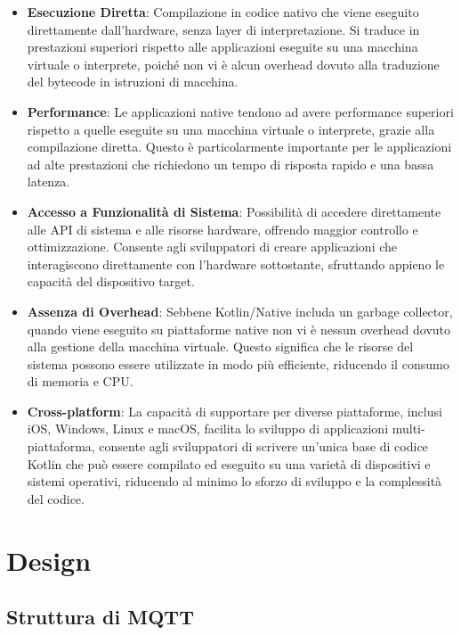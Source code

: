 \documentclass[12pt,a4paper,openright,twoside]{book}
\begin{document}
\begin{itemize}
\item \textbf{Esecuzione Diretta}: Compilazione in codice nativo che viene eseguito direttamente dall'hardware, senza layer di interpretazione. 
Si traduce in prestazioni superiori rispetto alle applicazioni eseguite su una macchina virtuale o interprete, poiché non vi è alcun overhead dovuto alla traduzione 
del bytecode in istruzioni di macchina.
\item \textbf{Performance}: Le applicazioni native tendono ad avere performance superiori rispetto a quelle eseguite su una macchina virtuale o interprete, 
grazie alla compilazione diretta. Questo è particolarmente importante per le applicazioni ad alte prestazioni che richiedono un tempo di risposta rapido e una bassa latenza.
\item \textbf{Accesso a Funzionalità di Sistema}: Possibilità di accedere direttamente alle API di sistema e alle risorse hardware, offrendo maggior controllo e ottimizzazione. 
Consente agli sviluppatori di creare applicazioni che interagiscono direttamente con l'hardware sottostante, sfruttando appieno le capacità del dispositivo target.
\item \textbf{Assenza di Overhead}: Sebbene Kotlin/Native includa un garbage collector, quando viene eseguito su piattaforme native non vi è nessun overhead dovuto alla 
gestione della macchina virtuale. Questo significa che le risorse del sistema possono essere utilizzate in modo più efficiente, riducendo il consumo di memoria e CPU.
\item \textbf{Cross-platform}: La capacità di supportare per diverse piattaforme, inclusi iOS, Windows, Linux e macOS, facilita lo sviluppo di applicazioni multi-piattaforma, 
consente agli sviluppatori di scrivere un'unica base di codice Kotlin che può essere compilato ed eseguito su una varietà di dispositivi e sistemi operativi, 
riducendo al minimo lo sforzo di sviluppo e la complessità del codice.
\end{itemize}

\chapter{Design}\label{chap:Design}

\section{Struttura di MQTT}
\end{document}
